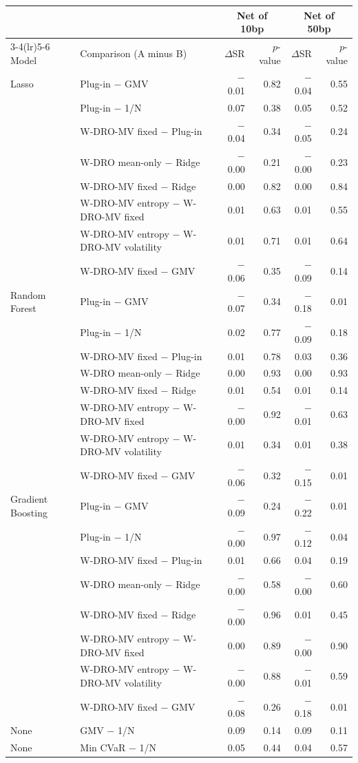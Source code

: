 \begin{tabular}{llrrrr}
\toprule
 & & \multicolumn{2}{c}{Net of 10bp} & \multicolumn{2}{c}{Net of 50bp} \\
\cmidrule(lr){3-4}\cmidrule(lr){5-6}
Model & Comparison (A minus B) & $\Delta$SR & $p$-value & $\Delta$SR & $p$-value \\
\midrule
Lasso & Plug-in $-$ GMV & $-$0.01 & 0.82 & $-$0.04 & 0.55 \\
 & Plug-in $-$ 1/N & 0.07 & 0.38 & 0.05 & 0.52 \\
 & W-DRO-MV fixed $-$ Plug-in & $-$0.04 & 0.34 & $-$0.05 & 0.24 \\
 & W-DRO mean-only $-$ Ridge & $-$0.00 & 0.21 & $-$0.00 & 0.23 \\
 & W-DRO-MV fixed $-$ Ridge & 0.00 & 0.82 & 0.00 & 0.84 \\
 & W-DRO-MV entropy $-$ W-DRO-MV fixed & 0.01 & 0.63 & 0.01 & 0.55 \\
 & W-DRO-MV entropy $-$ W-DRO-MV volatility & 0.01 & 0.71 & 0.01 & 0.64 \\
 & W-DRO-MV fixed $-$ GMV & $-$0.06 & 0.35 & $-$0.09 & 0.14 \\
\midrule
Random Forest & Plug-in $-$ GMV & $-$0.07 & 0.34 & $-$0.18 & 0.01 \\
 & Plug-in $-$ 1/N & 0.02 & 0.77 & $-$0.09 & 0.18 \\
 & W-DRO-MV fixed $-$ Plug-in & 0.01 & 0.78 & 0.03 & 0.36 \\
 & W-DRO mean-only $-$ Ridge & 0.00 & 0.93 & 0.00 & 0.93 \\
 & W-DRO-MV fixed $-$ Ridge & 0.01 & 0.54 & 0.01 & 0.14 \\
 & W-DRO-MV entropy $-$ W-DRO-MV fixed & $-$0.00 & 0.92 & $-$0.01 & 0.63 \\
 & W-DRO-MV entropy $-$ W-DRO-MV volatility & 0.01 & 0.34 & 0.01 & 0.38 \\
 & W-DRO-MV fixed $-$ GMV & $-$0.06 & 0.32 & $-$0.15 & 0.01 \\
\midrule
Gradient Boosting & Plug-in $-$ GMV & $-$0.09 & 0.24 & $-$0.22 & 0.01 \\
 & Plug-in $-$ 1/N & $-$0.00 & 0.97 & $-$0.12 & 0.04 \\
 & W-DRO-MV fixed $-$ Plug-in & 0.01 & 0.66 & 0.04 & 0.19 \\
 & W-DRO mean-only $-$ Ridge & $-$0.00 & 0.58 & $-$0.00 & 0.60 \\
 & W-DRO-MV fixed $-$ Ridge & $-$0.00 & 0.96 & 0.01 & 0.45 \\
 & W-DRO-MV entropy $-$ W-DRO-MV fixed & 0.00 & 0.89 & $-$0.00 & 0.90 \\
 & W-DRO-MV entropy $-$ W-DRO-MV volatility & $-$0.00 & 0.88 & $-$0.01 & 0.59 \\
 & W-DRO-MV fixed $-$ GMV & $-$0.08 & 0.26 & $-$0.18 & 0.01 \\
\midrule
None & GMV $-$ 1/N & 0.09 & 0.14 & 0.09 & 0.11 \\
None & Min CVaR $-$ 1/N & 0.05 & 0.44 & 0.04 & 0.57 \\
\bottomrule
\end{tabular}